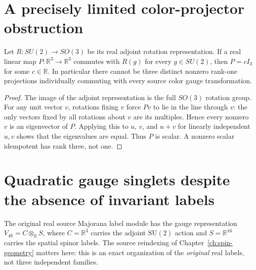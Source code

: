 \section{A precisely limited color-projector obstruction}
\begin{proposition}\label{prop:no-three-color-projectors}
Let $R:SU(2)\to SO(3)$ be its real adjoint rotation
representation. If a real linear map $P:\mathbb R^3\to\mathbb R^3$
commutes with $R(g)$ for every $g\in SU(2)$, then $P=cI_3$ for
some $c\in\mathbb R$. In particular there cannot be three distinct
nonzero rank-one projections individually commuting with every
source color gauge transformation.
\end{proposition}
\begin{proof}
The image of the adjoint representation is the full $SO(3)$
rotation group. For any unit vector $v$, rotations fixing $v$
force $Pv$ to lie in the line through $v$: the only vectors fixed
by all rotations about $v$ are its multiples. Hence every nonzero
$v$ is an eigenvector of $P$. Applying this to $u$, $v$, and $u+v$
for linearly independent $u,v$ shows that the eigenvalues are equal.
Thus $P$ is scalar. A nonzero scalar idempotent has rank three,
not one.
\end{proof}


\section{Quadratic gauge singlets despite the absence of invariant labels}
The original real source Majorana label module has the
gauge representation $V_{48}=C\otimes_{\mathbb R}S$, where
$C=\mathbb R^3$ carries the adjoint $\mathrm{SU}(2)$ action
and $S=\mathbb R^{16}$ carries the spatial spinor labels.
The source reindexing of Chapter~\ref{ch:spin-geometry}
matters here: this is an exact organization of the
\emph{original} real labels, not three independent families.

